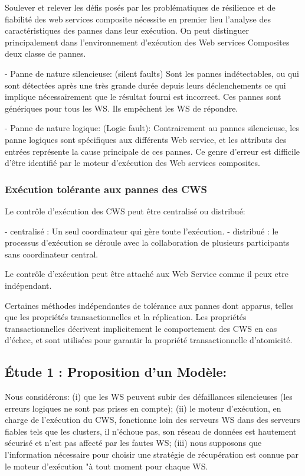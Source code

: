 Soulever et relever les défis posés par les problématiques de résilience et de fiabilité des web services composite nécessite en premier lieu l’analyse  des caractéristiques des pannes dans  leur exécution.
On peut distinguer principalement dans l’environnement d’exécution des Web services Composites deux classe de pannes. 

    - Panne de nature silencieuse: (silent faults) Sont les pannes indétectables, ou qui sont détectées après une très grande durée depuis leurs déclenchements ce qui implique nécessairement que le résultat fourni est incorrect. 
    Ces pannes sont génériques pour tous les WS. Ils empêchent les WS de répondre.


    - Panne de nature logique: (Logic fault): Contrairement au pannes silencieuse, les panne logiques sont spécifiques aux différents Web service, et les attributs des entrées représente la cause principale de ces pannes.
    Ce genre d’erreur est difficile d’être identifié par le moteur d’exécution des Web services composites.

\subsubsection{Exécution tolérante aux pannes des CWS}

Le contrôle d'exécution des CWS peut être centralisé ou distribué:

- centralisé : Un seul coordinateur qui gère toute l’exécution. 
- distribué : le processus d'exécution se déroule avec la collaboration de plusieurs participants sans coordinateur central.

Le contrôle d’exécution peut être attaché aux Web Service comme il peux etre indépendant.


Certaines méthodes indépendantes de tolérance aux pannes dont apparus, telles que les propriétés transactionnelles et la réplication. Les propriétés transactionnelles décrivent implicitement le comportement des CWS en cas d'échec, et sont utilisées pour garantir la propriété transactionnelle d’atomicité.
 
\subsection{Étude 1 : Proposition d'un Modèle:}

Nous considérons: (i) que les WS peuvent subir des défaillances silencieuses (les erreurs logiques ne sont pas prises en compte); (ii) le moteur d'exécution, en charge de l'exécution du CWS, fonctionne loin des serveurs WS dans des serveurs fiables tels que les clusters, il n'échoue pas, son réseau de données est hautement sécurisé et n'est pas affecté par les fautes WS; (iii) nous supposons que l'information nécessaire pour choisir une stratégie de récupération est connue par le moteur d'exécution "à tout moment pour chaque WS. 


